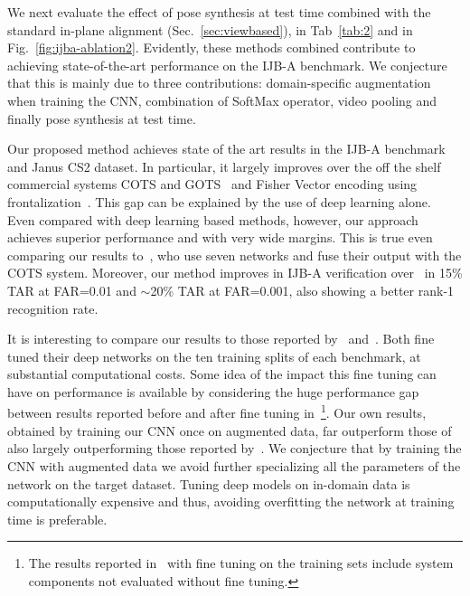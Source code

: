 \documentclass[runningheads]{llncs}
\newcommand{\minisection}[1]{\vspace{0.04in} \noindent {\bf #1:} }
\begin{document}
We next evaluate the effect of pose synthesis at test time combined with the standard in-plane alignment (Sec.~\ref{sec:viewbased}), in Tab~\ref{tab:2} and in Fig.~\ref{fig:ijba-ablation2}. Evidently, these methods combined contribute to achieving state-of-the-art performance on the IJB-A benchmark. We conjecture that this is mainly due to three contributions: domain-specific augmentation when training the CNN, combination of SoftMax operator, video pooling and finally pose synthesis at test time.




\minisection{Comparison with the state-of-the-art}
Our proposed method achieves state of the art results in the IJB-A benchmark and Janus CS2 dataset. In particular, it largely improves over the off the shelf commercial systems COTS and GOTS~\cite{klare2015pushing} and Fisher Vector encoding using frontalization~\cite{umd:FV}. This gap can be explained by the use of deep learning alone. Even compared with deep learning based methods, however, our approach achieves superior performance and with very wide margins. This is true even comparing our results to~\cite{80Msearch}, who use seven networks and fuse their output with the COTS system. Moreover, our method improves in IJB-A verification over~\cite{80Msearch}
in 15\% TAR at FAR=0.01 and $\sim$20\% TAR at FAR=0.001, also showing a better rank-1 recognition rate. 

It is interesting to compare our results to those reported by~\cite{chen2015unconstrained} and~\cite{Swami:UMD}. Both fine tuned their deep networks on the ten training splits of each benchmark, at substantial computational costs. Some idea of the impact this fine tuning can have on performance is available by considering the huge performance gap between results reported before and after fine tuning in~\cite{chen2015unconstrained}\footnote{The results reported in~\cite{chen2015unconstrained} with fine tuning on the training sets include system components not evaluated without fine tuning.}. Our own results, obtained by training our CNN once on augmented data, far outperform those of~\cite{Swami:UMD} also largely outperforming those reported by~\cite{chen2015unconstrained}. We conjecture that by training the CNN with augmented data we avoid further specializing all the parameters of the network on the target dataset. Tuning deep models on in-domain data is computationally expensive and thus, avoiding overfitting the network at training time is preferable.
\end{document}
